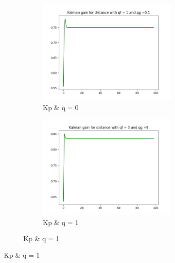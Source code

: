 \documentclass{article}
\begin{document}
        \begin{figure}[H]
            \centering 
            \begin{subfigure}{1\textwidth}  
                \begin{subfigure}{.3\textwidth}  
                    \includegraphics[width=1\linewidth]{./img/k11_qf1.png}
                    \caption{Kp \& q = 0 }
                \end{subfigure}
                \begin{subfigure}{.3\textwidth}  
                    \includegraphics[width=1\linewidth]{./img/k11_q3.png}
                    \caption{Kp \& q = 1 }
                \end{subfigure}

\end{subfigure}
\end{figure}
\end{document}
